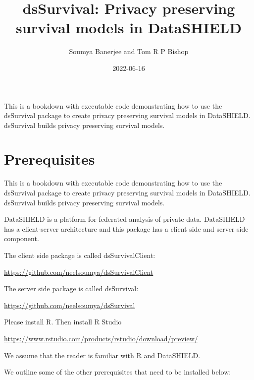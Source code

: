 \documentclass[
]{book}
\title{dsSurvival: Privacy preserving survival models in DataSHIELD}
\author{Soumya Banerjee and Tom R P Bishop}
\date{2022-06-16}
\begin{document}
\maketitle

{
\setcounter{tocdepth}{1}
\tableofcontents
}
This is a bookdown with executable code demonstrating how to use the dsSurvival package to create privacy preserving survival models in DataSHIELD. dsSurvival builds privacy preserving survival models.

\hypertarget{prerequisites}{%
\chapter{Prerequisites}\label{prerequisites}}

This is a bookdown with executable code demonstrating how to use the dsSurvival package to create privacy preserving survival models in DataSHIELD. dsSurvival builds privacy preserving survival models.

DataSHIELD is a platform for federated analysis of private data. DataSHIELD has a client-server architecture and this package has a client side and server side component.

The client side package is called dsSurvivalClient:

\url{https://github.com/neelsoumya/dsSurvivalClient}

The server side package is called dsSurvival:

\url{https://github.com/neelsoumya/dsSurvival}

Please install R. Then install R Studio

\url{https://www.rstudio.com/products/rstudio/download/preview/}

We assume that the reader is familiar with R and DataSHIELD.

We outline some of the other prerequisites that need to be installed below:
\end{document}
